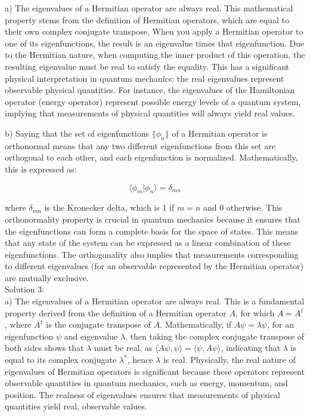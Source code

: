 \documentclass[a4paper,11pt]{article}
\begin{document}
a) The eigenvalues of a Hermitian operator are always real. This mathematical property stems from the definition of Hermitian operators, which are equal to their own complex conjugate transpose. When you apply a Hermitian operator to one of its eigenfunctions, the result is an eigenvalue times that eigenfunction. Due to the Hermitian nature, when computing the inner product of this operation, the resulting eigenvalue must be real to satisfy the equality. This has a significant physical interpretation in quantum mechanics: the real eigenvalues represent observable physical quantities. For instance, the eigenvalues of the Hamiltonian operator (energy operator) represent possible energy levels of a quantum system, implying that measurements of physical quantities will always yield real values.

b) Saying that the set of eigenfunctions \(\{ \phi_{n} \}\) of a Hermitian operator is orthonormal means that any two different eigenfunctions from this set are orthogonal to each other, and each eigenfunction is normalized. Mathematically, this is expressed as:

\[
\langle \phi_{m} | \phi_{n} \rangle = \delta_{mn}
\]

where \(\delta_{mn}\) is the Kronecker delta, which is 1 if \(m = n\) and 0 otherwise. This orthonormality property is crucial in quantum mechanics because it ensures that the eigenfunctions can form a complete basis for the space of states. This means that any state of the system can be expressed as a linear combination of these eigenfunctions. The orthogonality also implies that measurements corresponding to different eigenvalues (for an observable represented by the Hermitian operator) are mutually exclusive. \\

\noindent Solution 3: \\

a) The eigenvalues of a Hermitian operator are always real. This is a fundamental property derived from the definition of a Hermitian operator \(A\), for which \(A = A^\dagger\), where \(A^\dagger\) is the conjugate transpose of \(A\). Mathematically, if \(A\psi = \lambda\psi\), for an eigenfunction \(\psi\) and eigenvalue \(\lambda\), then taking the complex conjugate transpose of both sides shows that \(\lambda\) must be real, as \(\langle A\psi, \psi \rangle = \langle \psi, A\psi \rangle\), indicating that \(\lambda\) is equal to its complex conjugate \(\lambda^*\), hence \(\lambda\) is real. Physically, the real nature of eigenvalues of Hermitian operators is significant because these operators represent observable quantities in quantum mechanics, such as energy, momentum, and position. The realness of eigenvalues ensures that measurements of physical quantities yield real, observable values.
\end{document}
